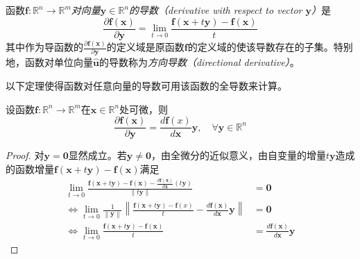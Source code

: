 \documentclass[main.tex]{subfiles}
\begin{document}
\begin{definition}\label{def:II.4.18}
    函数$\mathbf{f}:\mathbb{R}^n\rightarrow\mathbb{R}^m$\emph{对向量$\mathbf{y}\in\mathbb{R}^n$的导数（derivative with respect to vector $\mathbf{y}$）}是
    \[\frac{\partial\mathbf{f}\left(\mathbf{x}\right)}{\partial\mathbf{y}}=\lim_{t\to 0}\frac{\mathbf{f}\left(\mathbf{x}+t\mathbf{y}\right)-\mathbf{f}\left(\mathbf{x}\right)}{t}\]
    其中作为导函数的$\frac{\partial \mathbf{f}\left(\mathbf{x}\right)}{\partial\mathbf{y}}$的定义域是原函数$\mathbf{f}$的定义域的使该导数存在的子集。特别地，函数对单位向量$\mathbf{\hat{u}}$的导数称为\emph{方向导数（directional derivative）}。
\end{definition}

以下定理使得函数对任意向量的导数可用该函数的全导数来计算。

\begin{theorem}\label{thm:II.4.10}
    设函数$\mathbf{f}:\mathbb{R}^n\rightarrow\mathbb{R}^m$在$\mathbf{x}\in\mathbb{R}^n$处可微，则
    \[\frac{\partial\mathbf{f}\left(\mathbf{x}\right)}{\partial\mathbf{y}}=\frac{d\mathbf{f}\left(x\right)}{d\mathbf{x}}\mathbf{y},\quad\forall\mathbf{y}\in\mathbb{R}^n\]
\end{theorem}
\begin{proof}
    对$\mathbf{y}=\mathbf{0}$显然成立。若$\mathbf{y}\neq\mathbf{0}$，由全微分的近似意义，由自变量的增量$t\mathbf{y}$造成的函数增量$\mathbf{f}\left(\mathbf{x}+t\mathbf{y}\right)-\mathbf{f}\left(\mathbf{x}\right)$满足
    \begin{align*}
        \lim_{t\to 0}\frac{\mathbf{f}\left(\mathbf{x}+t\mathbf{y}\right)-\mathbf{f}\left(\mathbf{x}\right)-\frac{d\mathbf{f}\left(\mathbf{x}\right)}{d\mathbf{x}}\left(t\mathbf{y}\right)}{\left\|t\mathbf{y}\right\|}                  & =\mathbf{0}                                                       \\
        \Leftrightarrow\lim_{t\to 0}\frac{1}{\left\|\mathbf{y}\right\|}\left\|\frac{\mathbf{f}\left(\mathbf{x}+t\mathbf{y}\right)-\mathbf{f}\left(x\right)}{t}-\frac{d\mathbf{f}\left(\mathbf{x}\right)}{d\mathbf{x}}\mathbf{y}\right\| & =\mathbf{0}                                                       \\
        \Leftrightarrow\lim_{t\to 0}\frac{\mathbf{f}\left(\mathbf{x}+t\mathbf{y}\right)-\mathbf{f}\left(\mathbf{x}\right)}{t}                                                                                                           & =\frac{d\mathbf{f}\left(\mathbf{x}\right)}{d\mathbf{x}}\mathbf{y}
    \end{align*}
\end{proof}
\end{document}
